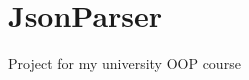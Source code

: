 \chapter{Json\+Parser}
\hypertarget{md_README}{}\label{md_README}
\label{md_README_autotoc_md0}%
%
Project for my university OOP course 